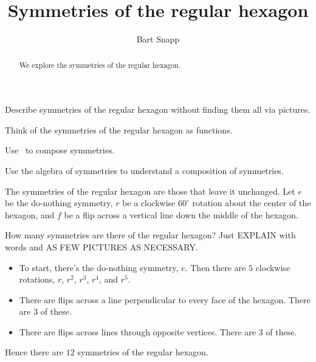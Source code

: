 \documentclass[noauthor,nooutcomes,hints,handout]{ximera}
\title{Symmetries of the regular hexagon}
\author{Bart Snapp}
\begin{document}
\begin{abstract}
  We explore the symmetries of the regular hexagon.
\end{abstract}
\maketitle

\begin{listOutcomes}
\item Describe symmetries of the regular hexagon without finding them
  all via pictures.
\item Think of the symmetries of the regular hexagon as functions.
\item Use \snap\ to compose symmetries.
\item Use the algebra of symmetries to understand a composition of
  symmetries.
\end{listOutcomes}
\mynewpage


\begin{question}
  The symmetries of the regular hexagon are those that leave it
  unchanged. Let $e$ be the do-nothing symmetry, $r$ be a clockwise
  $60^\circ$ rotation about the center of the hexagon, and $f$ be a
  flip across a vertical line down the middle of the hexagon.

  
  How many symmetries are there of the regular hexagon? Just
  EXPLAIN with words and AS FEW PICTURES AS NECESSARY.
  \begin{freeResponse}
    \begin{itemize}
    \item To start, there's the do-nothing symmetry, $e$. Then there are
      $5$ clockwise rotations, $r$, $r^2$, $r^3$, $r^4$, and $r^5$.
    \item There are flips across a line perpendicular to every face of
      the hexagon. There are $3$ of these.
    \item There are flips across lines through opposite
      vertices. There are $3$ of these.
    \end{itemize}
    Hence there are $12$ symmetries of the regular hexagon.
  \end{freeResponse}
\end{question}
\mynewpage
\end{document}
